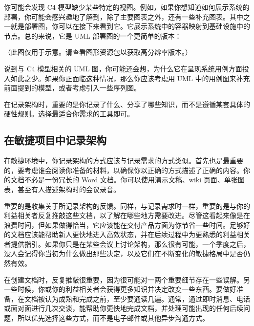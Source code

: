 
\label{idx:216}
\label{idx:217}
你可能会发现 C4 模型缺少某些特定的视图。例如，如果你想知道如何展示系统的部署，你可能会感兴趣地了解到，除了主要图表之外，还有一些补充图表。其中之一就是部署图，你可以在接下来看到它。它展示系统中的容器映射到基础设施中的节点。总的来说，它是 UML 部署图的一个更简单的版本：


（此图仅用于示意。请查看图形资源包以获取高分辨率版本。）

\label{idx:218}
\label{idx:219}
说到与 C4 模型相关的 UML 图，你可能还会想，为什么它在呈现系统用例方面投入如此之少。如果你正面临这种情况，那么你应该考虑用 UML 中的用例图来补充前面提到的模型，或者考虑引入一些序列图。

在记录架构时，重要的是你记录了什么、分享了哪些知识，而不是遵循某套具体的硬性规则。选择最适合你需求的工具即可。

\subsection{在敏捷项目中记录架构}

\label{idx:220}
在敏捷环境中，你记录架构的方式应该与记录需求的方式类似。首先也是最重要的，要考虑谁会阅读你准备的材料，以确保你以正确的方式描述了正确的内容。你的文档不必是一份冗长的 Word 文档。你可以使用演示文稿、wiki 页面、单张图表，甚至有人描述架构时的会议录音。

重要的是收集关于所记录架构的反馈。同样，与记录需求时一样，重要的是与你的利益相关者反复推敲这些文档，以了解在哪些地方需要改进。尽管这看起来像是在浪费时间，但如果做得恰当，它应该能在交付产品方面为你节省一些时间。足够好的文档应该能帮助新人更快地进入高效状态，并在后续过程中为更熟悉的利益相关者提供指引。如果你只是在某些会议上讨论架构，那么很有可能，一个季度之后，没人会记得你当初为什么做出那些决定，以及它们在不断变化的敏捷格局中是否仍然有效。

在创建文档时，反复推敲很重要，因为很可能对一两个重要细节存在一些误解。另一些时候，你或你的利益相关者会获得更多知识并决定改变一些东西。要做好准备，在文档被认为成熟和完成之前，至少要通读几遍。通常，通过即时消息、电话或面对面进行几次交谈，能帮助你更快地完成文档，并处理可能出现的任何后续问题，所以优先选择这些方式，而不是电子邮件或其他异步沟通方式。

